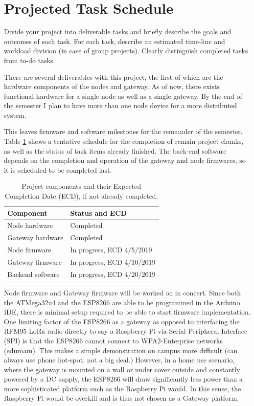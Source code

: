 \documentclass{IEEEtran}
\begin{document}
\section{Projected Task Schedule} 
Divide your project into deliverable tasks and briefly describe the goals and outcomes of each task. For each task, describe an estimated time-line and workload division (in case of group projects). Clearly distinguish completed tasks from to-do tasks.

There are several deliverables with this project, the first of which are the hardware components of the nodes and gateway. As of now, there exists functional hardware for a single node as well as a single gateway. By the end of the semester I plan to have more than one node device for a more distributed system.

This leaves firmware and software milestones for the remainder of the semester. Table \ref{tab:schedule} shows a tentative schedule for the completion of remain project chunks, as well as the status of task items already finished. The back-end software depends on the completion and operation of the gateway and node firmwares, so it is scheduled to be completed last.

\begin{table}[h!]
    \centering
    \begin{tabular}{l|l}
    Component & Status and ECD \\
    \hline
    \hline
    Node hardware     &  Completed \\
    Gateway hardware  &  Completed \\
    Node firmware     & In progress, ECD 4/5/2019 \\
    Gateway firmware  & In progress, ECD 4/10/2019 \\
    Backend software  & In progress, ECD 4/20/2019
    \end{tabular}
    \vspace{2mm}
    \caption{Project components and their Expected Completion Date (ECD), if not already completed. }
    \label{tab:schedule}
\end{table}

Node firmware and Gateway firmware will be worked on in concert. Since both the ATMega32u4 and the ESP8266 are able to be programmed in the Arduino IDE, there is minimal setup required to be able to start firmware implementation. One limiting factor of the ESP8266 as a gateway as opposed to interfacing the RFM95 LoRa radio directly to say a Raspberry Pi via Serial Peripheral Interface (SPI) is that the ESP8266 cannot connect to WPA2-Enterprise networks (eduroam). This makes a simple demonstration on campus more difficult (can always use phone hot-spot, not a big deal.) However, in a home use scenario, where the gateway is mounted on a wall or under cover outside and constantly powered by a DC supply, the ESP8266 will draw significantly less power than a more sophisticated platform such as the Raspberry Pi would. In this sense, the Raspberry Pi would be overkill and is thus not chosen as a Gateway platform.
\end{document}
